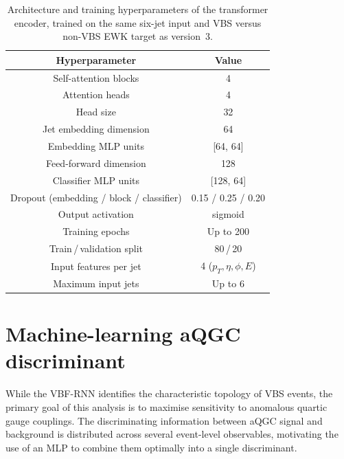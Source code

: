 \begin{table}[htbp]
  \centering
  \caption{Architecture and training hyperparameters of the transformer encoder, trained on the same six-jet input and VBS versus non-VBS EWK target as version~3.}
  \label{tab:transformer_hyperparams}
  \begin{tabular}{|c|c|}
    \hline
    \textbf{Hyperparameter} & \textbf{Value} \\
    \hline
    Self-attention blocks                       & 4 \\
    Attention heads                             & 4 \\
    Head size                                   & 32 \\
    Jet embedding dimension                     & 64 \\
    Embedding MLP units                         & [64, 64] \\
    Feed-forward dimension                      & 128 \\
    Classifier MLP units                        & [128, 64] \\
    Dropout (embedding / block / classifier)    & 0.15 / 0.25 / 0.20 \\
    Output activation                           & sigmoid \\
    Training epochs                             & Up to 200\\
    Train\,/\,validation split                  & 80\,/\,20 \\
    Input features per jet                      & 4 ($p_T,\eta,\phi,E$) \\
    Maximum input jets                          & Up to 6 \\
    \hline
  \end{tabular}
\end{table}

\section{Machine-learning aQGC discriminant}
\label{sec:mldiscriminant}

While the VBF-RNN identifies the characteristic topology of VBS events, the primary goal of this analysis is to maximise sensitivity to anomalous quartic gauge couplings. The discriminating information between aQGC signal and background is distributed across several event-level observables, motivating the use of an MLP to combine them optimally into a single discriminant.

